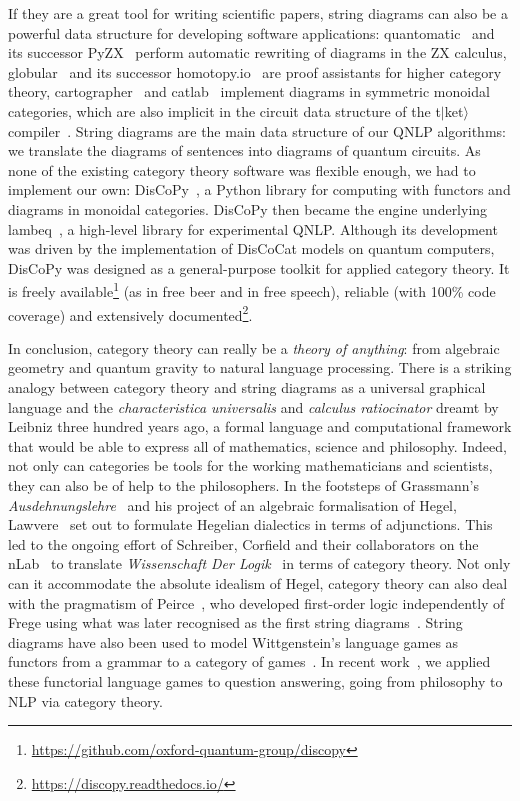 If they are a great tool for writing scientific papers, string diagrams can also be a powerful data structure for developing software applications:
quantomatic~\cite{KissingerZamdzhiev15} and its successor PyZX~\cite{KissingerVanDeWetering19} perform automatic rewriting of diagrams in the ZX calculus,
globular~\cite{BarEtAl18} and its successor homotopy.io~\cite{ReutterVicary19} are proof assistants for higher category theory,
cartographer~\cite{SobocinskiEtAl19} and catlab~\cite{PattersonEtAl21} implement diagrams in symmetric monoidal categories, which are also implicit in the circuit data structure of the t$|$ket$\rangle$ compiler~\cite{SivarajahEtAl20}.
String diagrams are the main data structure of our QNLP algorithms: we translate the diagrams of sentences into diagrams of quantum circuits.
As none of the existing category theory software was flexible enough, we had to implement our own: DisCoPy~\cite{FeliceEtAl20}, a Python library for computing with functors and diagrams in monoidal categories.
DisCoPy then became the engine underlying lambeq~\cite{KartsaklisEtAl21}, a high-level library for experimental QNLP.
Although its development was driven by the implementation of DisCoCat models on quantum computers, DisCoPy was designed as a general-purpose toolkit for applied category theory.
It is freely available\footnote{\url{https://github.com/oxford-quantum-group/discopy}} (as in free beer and in free speech), reliable (with 100\% code coverage) and extensively documented\footnote{\url{https://discopy.readthedocs.io/}}.

In conclusion, category theory can really be a \emph{theory of anything}: from algebraic geometry and quantum gravity to natural language processing.
There is a striking analogy between category theory and string diagrams as a universal graphical language and the \emph{characteristica universalis} and \emph{calculus ratiocinator} dreamt by Leibniz three hundred years ago, a formal language and computational framework that would be able to express all of mathematics, science and philosophy.
Indeed, not only can categories be tools for the working mathematicians and scientists, they can also be of help to the philosophers.
In the footsteps of Grassmann's \emph{Ausdehnungslehre}~\cite{Grassmann44} and his project of an algebraic formalisation of Hegel, Lawvere~\cite{Lawvere89,Lawvere91,Lawvere92,Lawvere96} set out to formulate Hegelian dialectics in terms of adjunctions.
This led to the ongoing effort of Schreiber, Corfield and their collaborators on the nLab~\cite{SchreiberEtAl21} to translate \emph{Wissenschaft Der Logik}~\cite{Hegel12} in terms of category theory.
Not only can it accommodate the absolute idealism of Hegel, category theory can also deal with the pragmatism of Peirce~\cite{Peirce06},
who developed first-order logic independently of Frege using what was later recognised as the first string diagrams~\cite{BradyTrimble98,BradyTrimble00,MelliesZeilberger16,HaydonSobocinski20}.
String diagrams have also been used to model Wittgenstein's language games as functors from a grammar to a category of games~\cite{HedgesLewis18}.
In recent work~\cite{FeliceEtAl20a}, we applied these functorial language games to question answering, going from philosophy to NLP via category theory.
